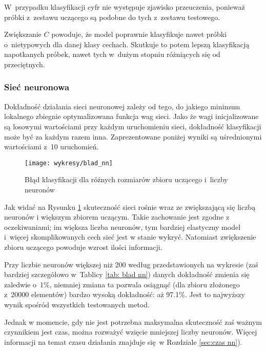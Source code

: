 \documentclass[12pt]{article}
\begin{document}
W~przypadku klasyfikacji cyfr nie występuje zjawisko przeuczenia, ponieważ próbki z~zestawu uczącego są podobne do tych z~zestawu testowego.

Zwiększanie $C$ powoduje, że model poprawnie klasyfikuje nawet próbki o~nietypowych dla danej klasy cechach. Skutkuje to potem lepszą klasyfikacją napotkanych próbek,
nawet tych w~dużym stopniu różniących się od przeciętnych.


\subsubsection{Sieć neuronowa}\label{sec:nn wyniki}
Dokładność działania sieci neuronowej zależy od tego, do jakiego minimum
lokalnego zbiegnie optymalizowana funkcja wag sieci. Jako że wagi inicjalizowane
są losowymi wartościami przy każdym uruchomieniu sieci, dokładność 
klasyfikacji może być za każdym razem inna. 
Zaprezentowane poniżej wyniki są uśrednionymi wartościami z~10 uruchomień.


\begin{figure}[H]
 \centering
 \texttt{[image: wykresy/blad\_nn]}
 \caption{Błąd klasyfikacji dla różnych rozmiarów zbioru uczącego i~liczby neuronów}
\label{fig:blad nn}
\end{figure}

Jak widać na Rysunku \ref{fig:blad nn} skuteczność sieci rośnie wraz ze
zwiększającą się liczbą neuronów i większym zbiorem uczącym. Takie zachowanie
jest zgodne z oczekiwaniami; im większa liczba neuronów, tym bardziej elastyczny model i~więcej
skomplikowanych cech sieć jest w stanie wykryć. Natomiast zwiększenie zbioru
uczącego powoduje wzrost ilości informacji.

Przy liczbie neuronów większej niż 200 według przedstawionych na wykresie
(zaś bardziej szczegółowo w~Tablicy \ref{tab: blad nn})
danych dokładność zmienia się zaledwie o~1\%, niemniej zmiana ta pozwala
osiągnąć (dla zbioru złożonego z~20000 elementów) bardzo wysoką dokładność: aż
97.1\%. Jest to najwyższy wynik spośród wszystkich testowanych metod.

Jednak w momencie, gdy nie jest potrzebna maksymalna skuteczność zaś
ważnym czynnikiem jest czas, można rozważyć wzięcie mniejszej liczby
neuronów. Więcej informacji na temat czasu działania znajduje się~w Rozdziale \ref{sec:czas nn}).
\end{document}
